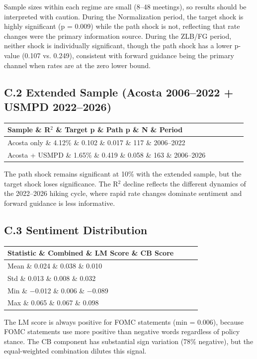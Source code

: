 Sample sizes within each regime are small (8--48 meetings), so results should be interpreted with caution. During the Normalization period, the target shock is highly significant (p = 0.009) while the path shock is not, reflecting that rate changes were the primary information source. During the ZLB/FG period, neither shock is individually significant, though the path shock has a lower p-value (0.107 vs. 0.249), consistent with forward guidance being the primary channel when rates are at the zero lower bound.

\subsection{C.2 Extended Sample (Acosta 2006--2022 + USMPD 2022--2026)}

\begin{table}[htbp]
\centering
\begin{tabular}{lccccc}
\toprule
Sample \& R$^2$ \& Target p \& Path p \& N \& Period \\
\midrule
Acosta only \& 4.12\% \& 0.102 \& 0.017 \& 117 \& 2006--2022 \\
Acosta + USMPD \& 1.65\% \& 0.419 \& 0.058 \& 163 \& 2006--2026 \\
\bottomrule
\end{tabular}
\end{table}

The path shock remains significant at 10\% with the extended sample, but the target shock loses significance. The R$^2$ decline reflects the different dynamics of the 2022--2026 hiking cycle, where rapid rate changes dominate sentiment and forward guidance is less informative.

\subsection{C.3 Sentiment Distribution}

\begin{table}[htbp]
\centering
\begin{tabular}{lccc}
\toprule
Statistic \& Combined \& LM Score \& CB Score \\
\midrule
Mean \& 0.024 \& 0.038 \& 0.010 \\
Std \& 0.013 \& 0.008 \& 0.032 \\
Min \& $-$0.012 \& 0.006 \& $-$0.089 \\
Max \& 0.065 \& 0.067 \& 0.098 \\
\bottomrule
\end{tabular}
\end{table}

The LM score is always positive for FOMC statements (min = 0.006), because FOMC statements use more positive than negative words regardless of policy stance. The CB component has substantial sign variation (78\% negative), but the equal-weighted combination dilutes this signal.